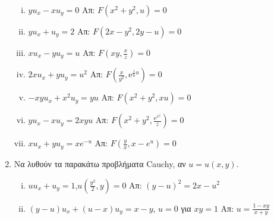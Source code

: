 \begin{enumerate}
    \begin{enumerate}[i)]
      \item $yu_{x}-xu_{y}=0$ \hfill Απ: $F(x^{2}+y^{2},u)=0$ 
      \item $yu_{x}+u_{y}=2$ \hfill Απ: $F(2x-y^{2},2y-u)=0$
      \item $ x u_{x}-yu_{y}=u $ \hfill Απ: $ F(xy, \frac{x}{z})=0 $
      \item $ 2x u_{x}+yu_{y}=u^{2} $ 
        \hfill Απ: $ F(\frac{x}{y^{2}},\mathrm{e}^{\frac{1}{u} u})=0 $ 
      \item $-xyu_{x}+x^{2}u_{y}=yu$ \hfill Απ: $F(x^{2}+y^{2},xu)=0$
      \item $ yu_{x}-xu_{y}=2xyu $ 
        \hfill Απ: $ F(x^{2}+y^{2}, \frac{\mathrm{e}^{x^{2}}}{z})=0 $  

      \item $xu_{x}+yu_{y}=xe^{-u}$ \hfill Απ: $F(\frac{y}{x},x-e^{u})=0$
    \end{enumerate}
  \item Να λυθούν τα παρακάτω προβλήματα Cauchy, αν $u=u(x,y)$.

    \begin{enumerate}[i)]
      \item $uu_{x}+u_{y}=1$,\quad $u(\frac{y^{2}}{2},y)=0$ 
        \hfill Απ: $(y-u)^{2}=2x-u^{2}$
      \item $ (y-u)u_{x}+(u-x)u_{y}=x-y $, \quad $ u=0 $ για $ xy=1 $
        \hfill Απ: $ u= \frac{1-xy}{x+y} $  


\end{enumerate}
\end{enumerate}
